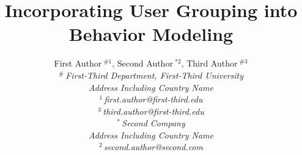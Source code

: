 \documentclass[10pt,conference,letterpaper]{IEEEtran}
\title{Incorporating User Grouping into \Retg{} Behavior Modeling}
\author{%
{First Author{\small $~^{\#1}$}, Second Author{\small $~^{*2}$}, Third Author{\small $~^{\#3}$} }%
\vspace{1.6mm}\\
\fontsize{10}{10}\selectfont\itshape
$^{\#}$\,First-Third Department, First-Third University\\
Address Including Country Name\\
\fontsize{9}{9}\selectfont\ttfamily\upshape
%
$^{1}$\,first.author@first-third.edu\\
$^{3}$\,third.author@first-third.edu%
\vspace{1.2mm}\\
\fontsize{10}{10}\selectfont\rmfamily\itshape
$^{*}$\,Second Company\\
Address Including Country Name\\
\fontsize{9}{9}\selectfont\ttfamily\upshape
$^{2}$\,second.author@second.com
}
\begin{document}
\newtheorem{definition}{Definition}
\newtheorem{problem}{Problem}
\newtheorem{theorem}{Theorem}
\newtheorem{remark}{Remark}
\newtheorem{lemma}[theorem]{Lemma}
\newtheorem{corollary}[theorem]{Corollary}
%
\newcommand{\sys}{\textcolor{blue}{SYSNAME}}
\newcommand{\tbc}{\textcolor{blue}{[To Be Completed]}}
\newcommand{\retg}{\textcolor{blue}{retweeting}}
\newcommand{\retgs}{\textcolor{blue}{retweetings}}
\newcommand{\Retg}{\textcolor{blue}{Retweeting}}
\newcommand{\retd}{\textcolor{blue}{retweeted}}
\newcommand{\ret}{\textcolor{blue}{retweet}}






\maketitle



















\cite{IEEEexample:article_typical}

\balance



\end{document}

